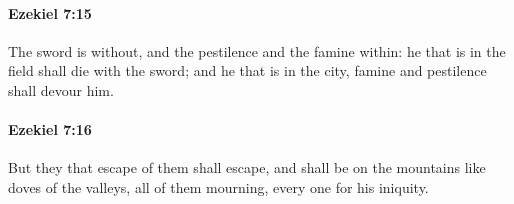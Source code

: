 		\paragraph{Ezekiel 7:15} %
			\label{EZEKIEL-7-15}

			The sword is without, and the pestilence and the famine within: he that is in the field shall die with the sword; and he that is in the city, famine and pestilence shall devour him.


		\paragraph{Ezekiel 7:16} %
			\label{EZEKIEL-7-16}

			But they that escape of them shall escape, and shall be on the mountains like doves of the valleys, all of them mourning, every one for his iniquity.



